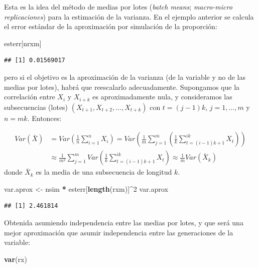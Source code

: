 \documentclass[
]{book}
\newenvironment{Shaded}{\begin{snugshade}}{\end{snugshade}}
\newcommand{\DecValTok}[1]{\textcolor[rgb]{0.00,0.00,0.81}{#1}}
\newcommand{\KeywordTok}[1]{\textcolor[rgb]{0.13,0.29,0.53}{\textbf{#1}}}
\newcommand{\NormalTok}[1]{#1}
\newcommand{\OperatorTok}[1]{\textcolor[rgb]{0.81,0.36,0.00}{\textbf{#1}}}
\newcommand{\StringTok}[1]{\textcolor[rgb]{0.31,0.60,0.02}{#1}}
\theoremstyle{break}
\theoremstyle{definition}
\theoremstyle{definition}
\theoremstyle{definition}
\theoremstyle{remark}
\begin{document}
Esta es la idea del método de medias por lotes
(\emph{batch means}; \emph{macro-micro replicaciones}) para la estimación de la varianza.
En el ejemplo anterior se calcula el error estándar de la aproximación por simulación de la proporción:

\begin{Shaded}
\begin{Highlighting}[]
\NormalTok{esterr[nrxm]}
\end{Highlighting}
\end{Shaded}

\begin{verbatim}
## [1] 0.01569017
\end{verbatim}

pero si el objetivo es la aproximación de la varianza (de la variable y no de las medias por lotes), habrá que reescalarlo adecuadamente.
Supongamos que la correlación entre \(X_i\) y \(X_{i+k}\) es aproximadamente nula,
y consideramos las subsecuencias (lotes) \((X_{t+1},X_{t+2},\ldots,X_{t+k})\) con \(t=(j-1)k\), \(j=1,\ldots,m\) y \(n = mk\).
Entonces:

\[\begin{aligned}
Var \left(\bar X \right) &= Var \left(\frac{1}{n} \sum_{i=1}^n X_i\right) 
= Var \left( \frac{1}{m}\sum_{j=1}^m \left(\frac{1}{k} \sum_{t=(i-1)k + 1}^{ik} X_t\right) \right) \\
&\approx \frac{1}{m^2} \sum_{j=1}^m Var \left(\frac{1}{k} \sum_{t=(i-1)k + 1}^{ik} X_t\right)
\approx \frac{1}{m} Var \left(\bar{X}_k \right)
\end{aligned}\]
donde \(\bar{X}_k\) es la media de una subsecuencia de longitud \(k\).

\begin{Shaded}
\begin{Highlighting}[]
\NormalTok{var.aprox <-}\StringTok{ }\NormalTok{nsim }\OperatorTok{*}\StringTok{ }\NormalTok{esterr[}\KeywordTok{length}\NormalTok{(rxm)]}\OperatorTok{^}\DecValTok{2}
\NormalTok{var.aprox}
\end{Highlighting}
\end{Shaded}

\begin{verbatim}
## [1] 2.461814
\end{verbatim}

Obtenida asumiendo independencia entre las medias por lotes, y que será
una mejor aproximación que asumir independencia entre las generaciones
de la variable:

\begin{Shaded}
\begin{Highlighting}[]
\KeywordTok{var}\NormalTok{(rx)}
\end{Highlighting}
\end{Shaded}
\end{document}
